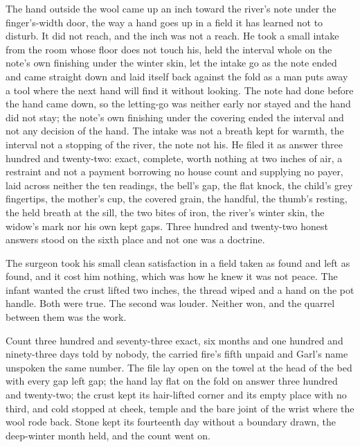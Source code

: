 The hand outside the wool came up an inch toward the river's note under the finger's-width door, the way a hand goes up in a field it has learned not to disturb. It did not reach, and the inch was not a reach. He took a small intake from the room whose floor does not touch his, held the interval whole on the note's own finishing under the winter skin, let the intake go as the note ended and came straight down and laid itself back against the fold as a man puts away a tool where the next hand will find it without looking. The note had done before the hand came down, so the letting-go was neither early nor stayed and the hand did not stay; the note's own finishing under the covering ended the interval and not any decision of the hand. The intake was not a breath kept for warmth, the interval not a stopping of the river, the note not his. He filed it as answer three hundred and twenty-two: exact, complete, worth nothing at two inches of air, a restraint and not a payment borrowing no house count and supplying no payer, laid across neither the ten readings, the bell's gap, the flat knock, the child's grey fingertips, the mother's cup, the covered grain, the handful, the thumb's resting, the held breath at the sill, the two bites of iron, the river's winter skin, the widow's mark nor his own kept gaps. Three hundred and twenty-two honest answers stood on the sixth place and not one was a doctrine.

The surgeon took his small clean satisfaction in a field taken as found and left as found, and it cost him nothing, which was how he knew it was not peace. The infant wanted the crust lifted two inches, the thread wiped and a hand on the pot handle. Both were true. The second was louder. Neither won, and the quarrel between them was the work.

Count three hundred and seventy-three exact, six months and one hundred and ninety-three days told by nobody, the carried fire's fifth unpaid and Garl's name unspoken the same number. The file lay open on the towel at the head of the bed with every gap left gap; the hand lay flat on the fold on answer three hundred and twenty-two; the crust kept its hair-lifted corner and its empty place with no third, and cold stopped at cheek, temple and the bare joint of the wrist where the wool rode back. Stone kept its fourteenth day without a boundary drawn, the deep-winter month held, and the count went on.
